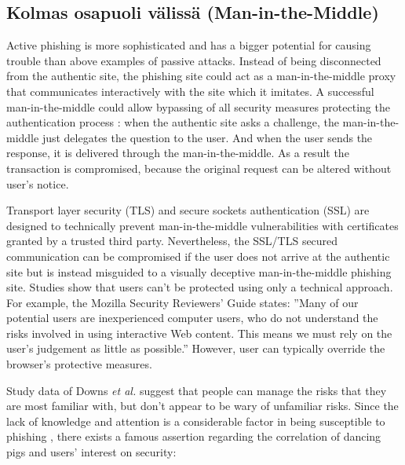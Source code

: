 \documentclass[english,gradu]{tktltiki}
\begin{document}
\subsection{Kolmas osapuoli välissä (Man-in-the-Middle)}
\label{sec:man_in_the_middle}

Active phishing is more sophisticated and has a bigger potential for causing trouble than above examples of passive attacks. Instead of being disconnected from the authentic site, the phishing site could act as a man-in-the-middle proxy that communicates interactively with the site which it imitates. A successful man-in-the-middle could allow bypassing of all security measures protecting the authentication process \cite{beamauth_2factor_2007, schneier_2factor_2005, why_phishing_works_06}: when the authentic site asks a challenge, the man-in-the-middle just delegates the question to the user. And when the user sends the response, it is delivered through the man-in-the-middle. As a result the transaction is compromised, because the original request can be altered without user's notice.

Transport layer security (TLS) and secure sockets authentication (SSL) are designed to technically prevent man-in-the-middle vulnerabilities with certificates granted by a trusted third party. Nevertheless, the SSL/TLS secured communication can be compromised if the user does not arrive at the authentic site but is instead misguided to a visually deceptive man-in-the-middle phishing site. Studies \cite{why_phishing_works_06, suspectibility_to_phishing_2006} show that users can't be protected using only a technical approach. For example, the Mozilla Security Reviewers' Guide \cite{mozilla_security_guide_2010} states: ''Many of our potential users are inexperienced computer users, who do not understand the risks involved in using interactive Web content. This means we must rely on the user's judgement as little as possible.'' However, user can typically override the browser's protective measures.

Study data of Downs \emph{et al.} \cite{suspectibility_to_phishing_2006} suggest that people can manage the risks that they are most familiar with, but don't appear to be wary of unfamiliar risks. Since the lack of knowledge and attention is a considerable factor in being susceptible to phishing \cite{why_phishing_works_06}, there exists a famous assertion regarding the correlation of dancing pigs and users' interest on security:
\end{document}

